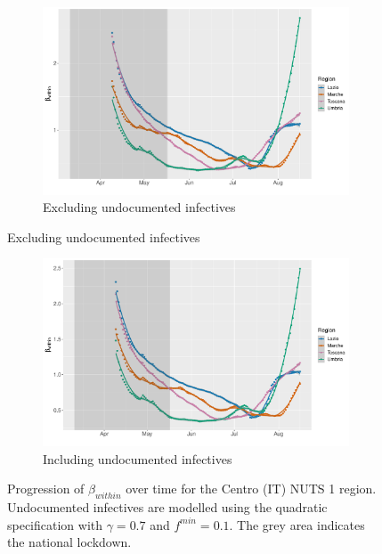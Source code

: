 \documentclass[12pt]{article}
\begin{document}
\begin{appendices}
		\begin{figure}[H]
    	    \centering
    	    \begin{subfigure}{\textwidth}
    	      \centering
    	      \includegraphics[width=0.94\linewidth]{output/model_within_lag14_betawithin_Centro (IT)_rollingwindow30.pdf}
    	      \caption{Excluding undocumented infectives}
    	      \label{fig:beta_within_over_time_centro_lowsample_regular}
    	    \end{subfigure}
        \end{figure}
        \begin{figure}[H]\ContinuedFloat
    	    \begin{subfigure}{\textwidth}
    	      \centering
    	      \includegraphics[width=0.94\linewidth]{output/model_within_lag14_betawithin_Centro (IT)_UndocQuadratic_rollingwindow30.pdf}
    	      \caption{Including undocumented infectives}
    	      \label{fig:beta_within_over_time_centro_lowsample_regular_undoc}
    	    \end{subfigure}
    	    \caption{Progression of $\beta_{within}$ over time for the Centro (IT) NUTS 1 region. Undocumented infectives are modelled using the quadratic specification with $\gamma = 0.7$ and $f^{min}=0.1$. The grey area indicates the national lockdown.}
    	    \label{fig:beta_within_over_time_centro_lowsample}
	    \end{figure}
		

\end{appendices}
\end{document}
